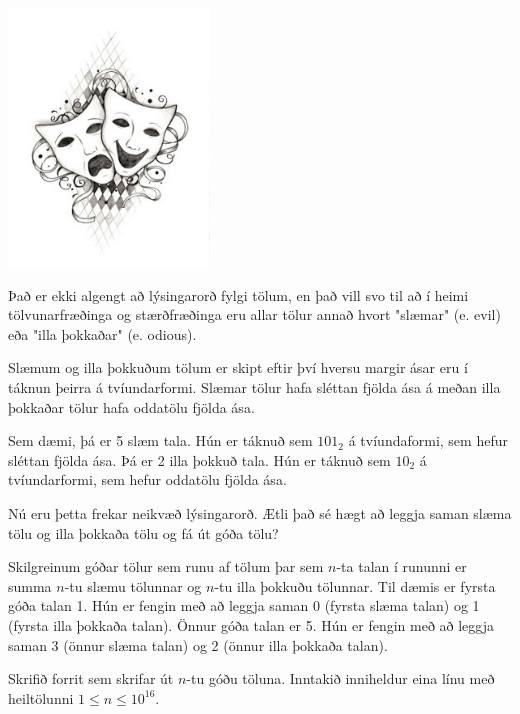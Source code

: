 
\includegraphics[width=0.4\textwidth]{masks.jpg}

Það er ekki algengt að lýsingarorð fylgi tölum, en það vill svo til að í
heimi tölvunarfræðinga og stærðfræðinga eru allar tölur annað hvort
"slæmar" (e. evil) eða "illa þokkaðar"
(e. odious).

Slæmum og illa þokkuðum tölum er skipt eftir því hversu margir ásar eru
í táknun þeirra á tvíundarformi. Slæmar tölur hafa sléttan fjölda ása á
meðan illa þokkaðar tölur hafa oddatölu fjölda ása.

Sem dæmi, þá er 5 slæm tala. Hún er táknuð sem $101_2$ á tvíundaformi,
sem hefur sléttan fjölda ása. Þá er 2 illa þokkuð tala. Hún er
táknuð sem $10_2$ á tvíundarformi, sem hefur oddatölu fjölda ása.

Nú eru þetta frekar neikvæð lýsingarorð. Ætli það sé hægt að leggja saman
slæma tölu og illa þokkaða tölu og fá út góða tölu?

Skilgreinum góðar tölur sem runu af tölum þar sem $n$-ta talan í rununni er
summa $n$-tu slæmu tölunnar og $n$-tu illa þokkuðu tölunnar. Til dæmis er
fyrsta góða talan 1. Hún er fengin með að leggja saman 0 (fyrsta slæma talan)
og 1 (fyrsta illa þokkaða talan). Önnur góða talan er 5. Hún er fengin með
að leggja saman 3 (önnur slæma talan) og 2 (önnur illa þokkaða talan).

Skrifið forrit sem skrifar út $n$-tu góðu töluna. Inntakið inniheldur eina
línu með heiltölunni $1 \leq n \leq 10^{16}$.

